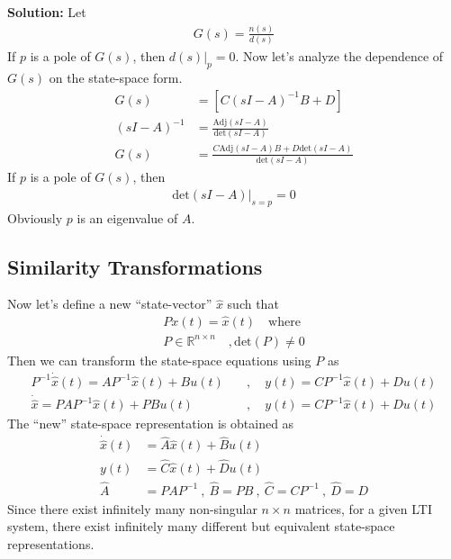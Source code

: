 \documentclass[twoside]{article}
\begin{document}
\textbf{Solution:} Let 
%
\begin{align*}
  G(s) = \frac{n(s)}{d(s)}
\end{align*}
%
If $p$ is a pole of $G(s)$, then $d(s)|_{p} = 0$. Now let's analyze
the dependence of $G(s)$ on the state-space form. 
%
\begin{align*}
  G(s) &= \left[ C \left(s I - A \right)^{-1} B + D \right]
\\
  \left(s I - A \right)^{-1} &= 
\frac{\mathrm{Adj} \left(s I - A \right) }{\mathrm{det} \left(s I - A
                               \right) }
\\
 G(s) &= \frac{C \mathrm{Adj} \left(s I - A \right) B + D \mathrm{det}
        \left(s I - A
                               \right)}{\mathrm{det} \left(s I - A
                               \right) }
\end{align*}
%
If $p$ is a pole of $G(s)$, then 
%
\begin{align*}
\mathrm{det} \left(s I - A \right)|_{s = p} = 0
\end{align*}
%
Obviously $p$ is an eigenvalue of $A$.


\subsection{Similarity Transformations}

Now let's define a new ``state-vector'' $\hat{x}$ such that
%
\begin{align*}
  P x(t) = \hat{x}(t) \quad \mathrm{where}
\\
  P \in \mathbb{R}^{n \times n} \quad , \mathrm{det}(P) \neq 0
\end{align*}
%
Then we can transform the state-space equations using $P$ as
%
\begin{align*}
  P^{-1} \dot{\hat{x}}(t) = A P^{-1} \hat{x}(t) + B u(t) 
\quad &, \quad y(t) = C P^{-1} \hat{x}(t) + D u(t)
\\
  \dot{\hat{x}} = P A P^{-1} \hat{x}(t)+ P B u(t)
\quad &, \quad y(t) = C P^{-1} \hat{x}(t) + D u(t)
\end{align*}
%
The ``new'' state-space representation is obtained as
%
\begin{align*}
  \dot{\hat{x}}(t)  &= \hat{A} \hat{x}(t) + \hat{B} u(t)
    \\
  y(t) &= \hat{C} \hat{x}(t) + \hat{D} u(t)
\\
\hat{A} &= P  A P^{-1} \ , \ \hat{B} = P  B \ , \ \hat{C} = C P^{-1} \ ,
  \ \hat{D} = D
\end{align*}
%
Since there exist infinitely many non-singular $n \times n$
matrices, for a given LTI system, there exist infinitely 
many different but equivalent state-space representations.
\end{document}

